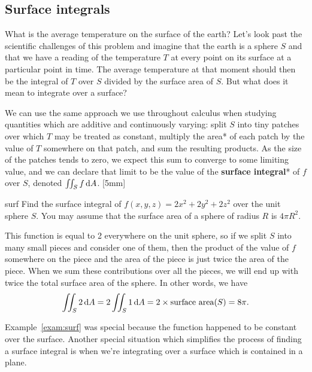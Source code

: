 \documentclass{watsonbook}
\begin{document}
\subsection{Surface integrals}


What is the average temperature on the surface of the earth? Let's
look past the scientific challenges of this problem and imagine that
the earth is a sphere $S$ and that we have a reading of the
temperature $T$ at every point on its surface at a particular point in
time. The average temperature at that moment should then be the
integral of $T$ over $S$ divided by the surface area of $S$. But what
does it mean to integrate over a surface?

We can use the same approach we use throughout calculus when studying
quantities which are additive and continuously varying: split $S$ into
tiny patches over which $T$ may be treated as constant, multiply the
area* of each patch by the value of $T$ somewhere on that patch, and
sum the resulting products. As the size of the patches tends to zero,
we expect this sum to converge to some limiting value, and we can
declare that limit to be the value of the \textbf{surface integral}*
of $f$ over $S$, denoted $\iint_S f \, {\mathrm{d}}A$. [5mm]

\begin{example}{}{surf}
  Find the surface integral of $f(x,y,z) = 2x^2 +2y^2 + 2z^2$ over the
  unit sphere $S$. You may assume that the surface area of a sphere of
  radius $R$ is $4\pi R^2$. 
\end{example}

\begin{solution}
  This function is equal to 2 everywhere on the unit sphere, so if we
  split $S$ into many small pieces and consider one of them, then the
  product of the value of $f$ somewhere on the piece and the area of
  the piece is just twice the area of the piece. When we sum these
  contributions over all the pieces, we will end up with twice the
  total surface area of the sphere. In other words, we have
  \[
    \iint_{S} 2 \,\mathrm{d} A =     2 \iint_{S} 1 \,\mathrm{d} A = 2 \times \text{surface
      area}(S) = 8\pi. 
  \]
\end{solution}

Example~\ref{exam:surf} was special because the function happened to
be constant over the surface. Another special situation which
simplifies the process of finding a surface integral is when
we're integrating over a surface which is contained in a plane. 
\end{document}
